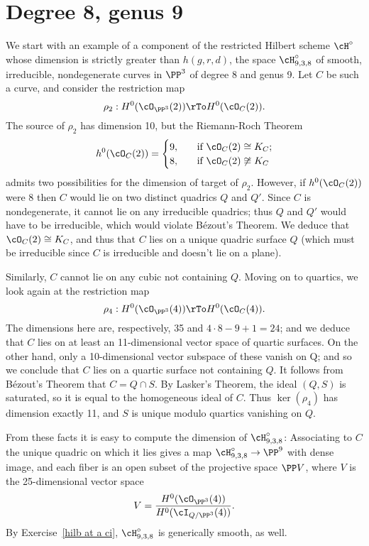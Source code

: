 \section{Degree 8, genus 9}\label{degree 8 section}

We start with an example of a component of the restricted Hilbert scheme $\cH^\circ$ whose dimension is strictly greater than $h(g,r,d)$, the space $\cH^\circ_{9,3,8}$ of smooth, irreducible, nondegenerate curves in $\PP^3$ of degree 8 and genus 9. Let $C$ be such a curve, and consider the restriction map
$$
\rho_2 : H^0(\cO_{\PP^3}(2)) \rTo H^0(\cO_C(2)).
$$
The source of $\rho_2$ has dimension 10, but the Riemann-Roch Theorem
\begin{align*}
h^0(\cO_C(2)) =
\begin{cases}
9, \quad &\text{if } \cO_C(2) \cong K_C; \\
8,  \quad &\text{if } \cO_C(2) \not\cong K_C
\end{cases}
\end{align*}
admits two possibilities for the dimension of target of $\rho_2$.
However, if $h^0(\cO_C(2))$ were 8 then $C$ would  lie on two distinct quadrics $Q$ and $Q'$. Since $C$ is nondegenerate, it cannot lie on any irreducible quadrics; thus $Q$ and $Q'$ would have to be irreducible, which would violate B\'ezout's Theorem. We deduce that $\cO_C(2) \cong K_C$, and thus that $C$ lies on a unique quadric surface $Q$ (which must be irreducible since $C$ is irreducible and doesn't lie on a plane).

Similarly, $C$ cannot lie on any cubic not containing $Q$. Moving on to quartics, we look again at the restriction map
$$
\rho_4 : H^0(\cO_{\PP^3}(4)) \rTo H^0(\cO_C(4)).
$$
The dimensions here are, respectively, 35 and $4\cdot 8 - 9 + 1 = 24$; and we deduce that $C$ lies on at least an 11-dimensional vector space of quartic surfaces. On the other hand, only a 10-dimensional vector subspace of these vanish on Q; and so we conclude that $C$ lies on a quartic surface not containing $Q$. It follows from B\'ezout's Theorem that $C = Q \cap S$. By Lasker's Theorem, the ideal $(Q,S)$ is saturated, so it is equal to the homogeneous ideal of $C$. Thus $\ker(\rho_4)$ has dimension exactly 11, and  $S$ is unique modulo quartics vanishing on $Q$.

From these facts it is easy to compute the dimension of  $\cH^\circ_{9,3,8}$: Associating to $C$ the unique quadric on which it lies gives a map $\cH^\circ_{9,3,8} \to \PP^9$ with dense image, and each fiber is an open subset of the projective space $\PP V$, where $V$ is the 25-dimensional vector space
$$
V = \frac{H^0(\cO_{\PP^3}(4))}{H^0(\cI_{Q/\PP^3}(4))}.
$$
By Exercise~\ref{hilb at a ci}, $\cH^\circ_{9,3,8}$ is generically smooth, as well.

